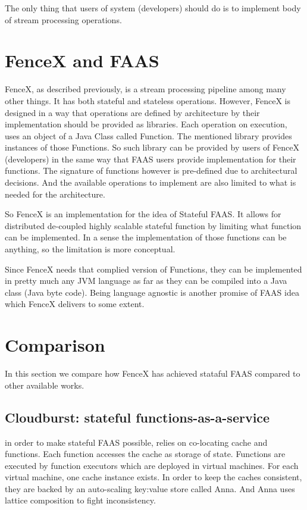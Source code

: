 \documentclass[a4]{report}
\begin{document}
    The only thing that users of system (developers) should do is to implement body of stream processing operations.

    \section{FenceX and FAAS}
    FenceX, as described previously, is a stream processing pipeline among many other things.
    It has both stateful and stateless operations.
    However, FenceX is designed in a way that operations are defined by architecture by their implementation should
    be provided as libraries.
    Each operation on execution, uses an object of a Java Class called Function.
    The mentioned library provides instances of those Functions.
    So such library can be provided by users of FenceX (developers) in the same way that FAAS users provide
    implementation for their functions.
    The signature of functions however is pre-defined due to architectural decisions.
    And the available operations to implement are also limited to what is needed for the architecture.

    So FenceX is an implementation for the idea of Stateful FAAS.
    It allows for distributed de-coupled highly scalable stateful function by limiting what function can be implemented.
    In a sense the implementation of those functions can be anything, so the limitation is more conceptual.

    Since FenceX needs that complied version of Functions, they can be implemented in pretty much any JVM language as
    far as they can be compiled into a Java class (Java byte code).
    Being language agnostic is another promise of FAAS idea which FenceX delivers to some extent.

    \section{Comparison}
    In this section we compare how FenceX has achieved stataful FAAS compared to other available works.
    \subsection{Cloudburst: stateful functions-as-a-service \cite{Functions-as-a-Service-2020}}
    \cite{Functions-as-a-Service-2020} in order to make stateful FAAS possible, relies on co-locating cache and
    functions.
    Each function accesses the cache as storage of state.
    Functions are executed by function executors which are deployed in virtual machines.
    For each virtual machine, one cache instance exists.
    In order to keep the caches consistent, they are backed by an auto-scaling key:value store called Anna.
    And Anna uses lattice composition to fight inconsistency.
\end{document}
